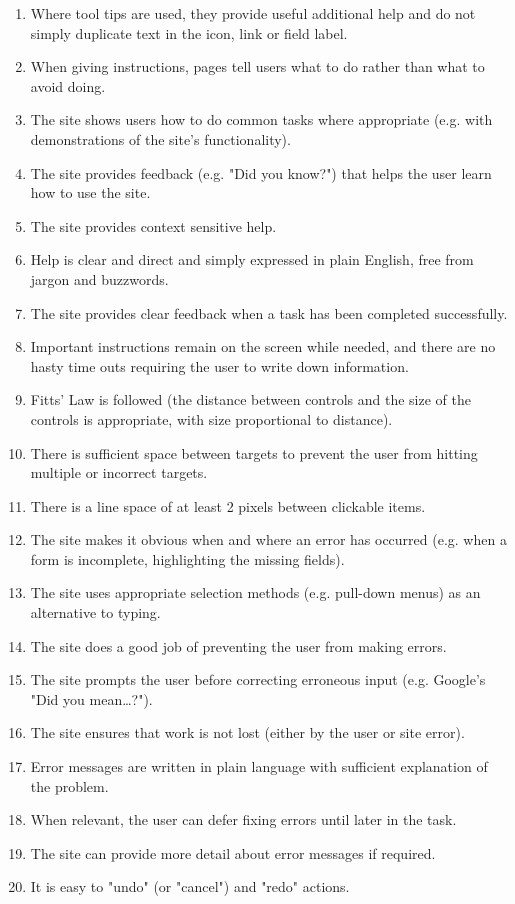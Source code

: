 \begin{itemize}
\begin{enumerate}
        \item Where tool tips are used, they provide useful additional help and do not simply duplicate text in the icon, link or field label.
        \item When giving instructions, pages tell users what to do rather than what to avoid doing.
        \item The site shows users how to do common tasks where appropriate (e.g. with demonstrations of the site's functionality).
        \item The site provides feedback (e.g. "Did you know?") that helps the user learn how to use the site.
        \item The site provides context sensitive help.
        \item Help is clear and direct and simply expressed in plain English, free from jargon and buzzwords.
        \item The site provides clear feedback when a task has been completed successfully.
        \item Important instructions remain on the screen while needed, and there are no hasty time outs requiring the user to write down information.
        \item Fitts' Law is followed (the distance between controls and the size of the controls is appropriate, with size proportional to distance).
        \item There is sufficient space between targets to prevent the user from hitting multiple or incorrect targets.
        \item There is a line space of at least 2 pixels between clickable items.
        \item The site makes it obvious when and where an error has occurred (e.g. when a form is incomplete, highlighting the missing fields).
        \item The site uses appropriate selection methods (e.g. pull-down menus) as an alternative to typing.
        \item The site does a good job of preventing the user from making errors.
        \item The site prompts the user before correcting erroneous input (e.g. Google's "Did you mean…?").
        \item The site ensures that work is not lost (either by the user or site error).
        \item Error messages are written in plain language with sufficient explanation of the problem.
        \item When relevant, the user can defer fixing errors until later in the task.
        \item The site can provide more detail about error messages if required.
        \item It is easy to "undo" (or "cancel") and "redo" actions.        
      \end{enumerate}
\end{itemize}


